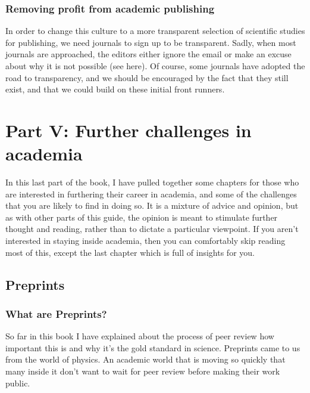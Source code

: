 \documentclass[
]{krantz}
\begin{document}
\hypertarget{removing-profit-from-academic-publishing}{%
\section{Removing profit from academic publishing}\label{removing-profit-from-academic-publishing}}

In order to change this culture to a more transparent selection of scientific studies for publishing, we need journals to sign up to be transparent. Sadly, when most journals are approached, the editors either ignore the email or make an excuse about why it is not possible (see here). Of course, some journals have adopted the road to transparency, and we should be encouraged by the fact that they still exist, and that we could build on these initial front runners.

\hypertarget{part5}{%
\part{Part V: Further challenges in academia}\label{part5}}

In this last part of the book, I have pulled together some chapters for those who are interested in furthering their career in academia, and some of the challenges that you are likely to find in doing so. It is a mixture of advice and opinion, but as with other parts of this guide, the opinion is meant to stimulate further thought and reading, rather than to dictate a particular viewpoint. If you aren't interested in staying inside academia, then you can comfortably skip reading most of this, except the last chapter which is full of insights for you.

\hypertarget{preprints2}{%
\chapter{Preprints}\label{preprints2}}

\hypertarget{what-are-preprints}{%
\section{What are Preprints?}\label{what-are-preprints}}

So far in this book I have explained about the process of peer review how important this is and why it's the gold standard in science. Preprints came to us from the world of physics. An academic world that is moving so quickly that many inside it don't want to wait for peer review before making their work public.
\end{document}
